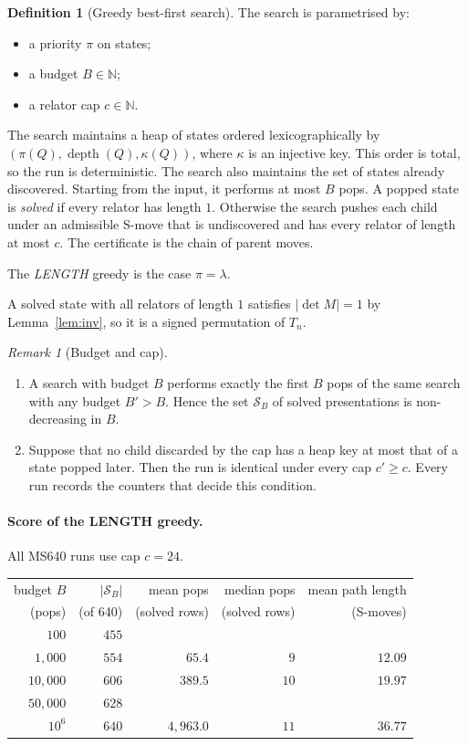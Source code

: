 \documentclass[11pt]{article}
\theoremstyle{definition}
\newtheorem{definition}[theorem]{Definition}
\theoremstyle{remark}
\newtheorem{remark}[theorem]{Remark}
\newcommand{\Sol}{\mathcal{S}}
\begin{document}
\begin{definition}[Greedy best-first search]\label{def:greedy}
The search is parametrised by:
\begin{itemize}
  \item a priority $\pi$ on states;
  \item a budget $B\in\mathbb{N}$;
  \item a relator cap $c\in\mathbb{N}$.
\end{itemize}
The search maintains a heap of states ordered lexicographically by $(\pi(Q),\operatorname{depth}(Q),\kappa(Q))$, where
$\kappa$ is an injective key. This order is total, so the run is deterministic. The search also maintains the set of
states already discovered. Starting from the input, it performs at most $B$ pops. A popped state is \emph{solved} if
every relator has length $1$. Otherwise the search pushes each child under an admissible S-move that is undiscovered
and has every relator of length at most $c$. The certificate is the chain of parent moves.

The \emph{LENGTH} greedy is the case $\pi=\lambda$.
\end{definition}

A solved state with all relators of length $1$ satisfies $|\det M|=1$ by Lemma~\ref{lem:inv}, so it is a signed
permutation of $T_n$.

\begin{remark}[Budget and cap]\label{rem:budget}
\begin{enumerate}
  \item A search with budget $B$ performs exactly the first $B$ pops of the same search with any budget $B'>B$. Hence the
  set $\Sol_B$ of solved presentations is non-decreasing in $B$.
  \item Suppose that no child discarded by the cap has a heap key at most that of a state popped later. Then the run is
  identical under every cap $c'\ge c$. Every run records the counters that decide this condition.
\end{enumerate}
\end{remark}

\paragraph{Score of the LENGTH greedy.} All MS640 runs use cap $c=24$.

\begin{center}
\begin{tabular}{rrrrr}
\toprule
budget $B$ & $|\Sol_B|$ & mean pops & median pops & mean path length\\
(pops) & (of 640) & (solved rows) & (solved rows) & (S-moves)\\
\midrule
$100$ & $455$ & & & \\
$1{,}000$ & $554$ & $65.4$ & $9$ & $12.09$\\
$10{,}000$ & $606$ & $389.5$ & $10$ & $19.97$\\
$50{,}000$ & $628$ & & & \\
$10^{6}$ & $640$ & $4{,}963.0$ & $11$ & $36.77$\\
\bottomrule
\end{tabular}
\end{center}
\end{document}
